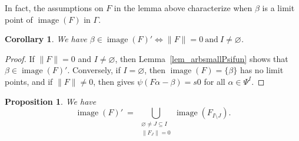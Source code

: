 \documentclass[11pt]{amsart}
\theoremstyle{plain}
\newtheorem{cor}[thm]{Corollary}
\newtheorem{prop}[thm]{Proposition}
\theoremstyle{definition}
\numberwithin{equation}{section}
\newcommand\0{\varnothing}
\DeclareMathOperator\image{image}
\begin{document}
\noindent
In fact, the assumptions on $F$ in the lemma above characterize when $\beta$ is a limit point of $\image(F)$ in $\Gamma$.
\begin{cor}
We have $\beta \in \image(F)' \Leftrightarrow \|F\|=0\ \text{and}\ I\neq\0$.
\end{cor}
\begin{proof}
If $\|F\|=0$ and $I\neq\0$, then
Lemma~\ref{lem_arbsmallPsifun} shows that $\beta\in\image(F)'$.
Conversely, if $I=\0$,
then $\image(F)=\{\beta\}$ has no limit points, and if $\|F\|\neq 0$, then \cite[Lemma~6.4]{GehretACTlog} gives $\psi(F\alpha-\beta)=s0$ for all $\alpha\in\Psi^I$.
\end{proof}


\begin{prop}\label{prop_derivePsifun}
We have
\[
\image(F)' \ = \ \bigcup_{\substack{\0\neq J\subseteq I \\ \|F_J\|=0}} \image(F_{I\setminus J}).
\]
\end{prop}
\end{document}

